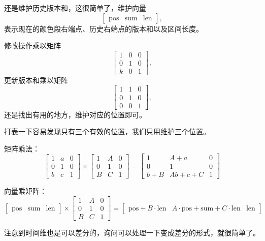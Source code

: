 \documentclass[a4paper,fontset=none]{ctexart}
\begin{document}
还是维护历史版本和，这很简单了，维护向量
\[
\begin{bmatrix} \text{pos} & \text{sum} & \text{len} \end{bmatrix},
\]
表示现在的颜色段右端点、历史右端点的版本和以及区间长度。

修改操作乘以矩阵
\[
\begin{bmatrix}
1 & 0 & 0 \\
0 & 1 & 0 \\
k & 0 & 1
\end{bmatrix},
\]
更新版本和乘以矩阵
\[
\begin{bmatrix}
1 & 1 & 0 \\
0 & 1 & 0 \\
0 & 0 & 1
\end{bmatrix},
\]
还是找出有用的地方，维护对应的位置即可。

打表一下容易发现只有三个有效的位置，我们只用维护三个位置。

矩阵乘法：
\[
\begin{bmatrix}
1 & a & 0 \\
0 & 1 & 0 \\
b & c & 1
\end{bmatrix}
\times
\begin{bmatrix}
1 & A & 0 \\
0 & 1 & 0 \\
B & C & 1
\end{bmatrix}
=
\begin{bmatrix}
1 & A + a & 0 \\
0 & 1 & 0 \\
b + B & Ab + c + C & 1
\end{bmatrix}
\]

向量乘矩阵：
\[
\begin{bmatrix} \text{pos} & \text{sum} & \text{len} \end{bmatrix}
\times
\begin{bmatrix}
1 & A & 0 \\
0 & 1 & 0 \\
B & C & 1
\end{bmatrix}
=
\begin{bmatrix}
\text{pos} + B \cdot \text{len} &
A \cdot \text{pos} + \text{sum} + C \cdot \text{len} &
\text{len}
\end{bmatrix}
\]


注意到时间维也是可以差分的，询问可以处理一下变成差分的形式，就很简单了。
\end{document}

